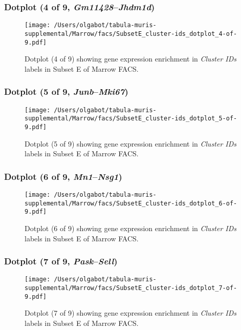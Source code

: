 \clearpage

\subsubsection{Dotplot (4 of 9, \emph{Gm11428}--\emph{Jhdm1d})}
\begin{figure}[h]
\centering
\texttt{[image: /Users/olgabot/tabula-muris-supplemental/Marrow/facs/SubsetE\_cluster-ids\_dotplot\_4-of-9.pdf]}

\caption{ Dotplot (4 of 9)  showing gene expression enrichment in \emph{Cluster IDs} labels in Subset E of Marrow FACS. }
\end{figure}


\clearpage

\subsubsection{Dotplot (5 of 9, \emph{Junb}--\emph{Mki67})}
\begin{figure}[h]
\centering
\texttt{[image: /Users/olgabot/tabula-muris-supplemental/Marrow/facs/SubsetE\_cluster-ids\_dotplot\_5-of-9.pdf]}

\caption{ Dotplot (5 of 9)  showing gene expression enrichment in \emph{Cluster IDs} labels in Subset E of Marrow FACS. }
\end{figure}


\clearpage

\subsubsection{Dotplot (6 of 9, \emph{Mn1}--\emph{Nsg1})}
\begin{figure}[h]
\centering
\texttt{[image: /Users/olgabot/tabula-muris-supplemental/Marrow/facs/SubsetE\_cluster-ids\_dotplot\_6-of-9.pdf]}

\caption{ Dotplot (6 of 9)  showing gene expression enrichment in \emph{Cluster IDs} labels in Subset E of Marrow FACS. }
\end{figure}


\clearpage

\subsubsection{Dotplot (7 of 9, \emph{Pask}--\emph{Sell})}
\begin{figure}[h]
\centering
\texttt{[image: /Users/olgabot/tabula-muris-supplemental/Marrow/facs/SubsetE\_cluster-ids\_dotplot\_7-of-9.pdf]}

\caption{ Dotplot (7 of 9)  showing gene expression enrichment in \emph{Cluster IDs} labels in Subset E of Marrow FACS. }
\end{figure}


